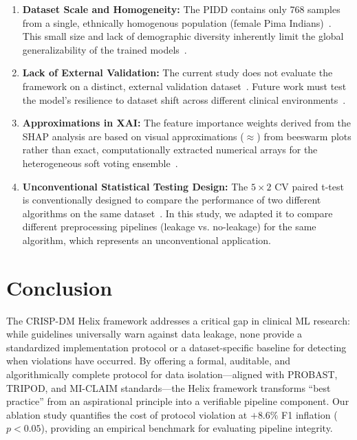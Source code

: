 \documentclass[3p,twocolumn]{elsarticle}
\begin{document}
\begin{enumerate}[nosep]
    \item \textbf{Dataset Scale and Homogeneity:} The PIDD contains only 768 samples from a single, ethnically homogenous population (female Pima Indians)~\cite{KagglePIDD, Smith1988}. This small size and lack of demographic diversity inherently limit the global generalizability of the trained models~\cite{Riley2020SampleSize}.
    \item \textbf{Lack of External Validation:} The current study does not evaluate the framework on a distinct, external validation dataset~\cite{Kapoor2024Leakage}. Future work must test the model's resilience to dataset shift across different clinical environments~\cite{Wen2024Leakage}.
    \item \textbf{Approximations in XAI:} The feature importance weights derived from the SHAP analysis are based on visual approximations ($\approx$) from beeswarm plots rather than exact, computationally extracted numerical arrays for the heterogeneous soft voting ensemble~\cite{Kapoor2024Leakage}.
    \item \textbf{Unconventional Statistical Testing Design:} The $5 \times 2$ CV paired t-test is conventionally designed to compare the performance of two different algorithms on the same dataset~\cite{Dietterich1998}. In this study, we adapted it to compare different preprocessing pipelines (leakage vs. no-leakage) for the same algorithm, which represents an unconventional application.
\end{enumerate}


\section{Conclusion}

The CRISP-DM Helix framework addresses a critical gap in clinical ML research: while guidelines universally warn against data leakage, none provide a standardized implementation protocol or a dataset-specific baseline for detecting when violations have occurred. By offering a formal, auditable, and algorithmically complete protocol for data isolation---aligned with PROBAST, TRIPOD, and MI-CLAIM standards---the Helix framework transforms ``best practice'' from an aspirational principle into a verifiable pipeline component. Our ablation study quantifies the cost of protocol violation at $+8.6\%$ F1 inflation ($p < 0.05$), providing an empirical benchmark for evaluating pipeline integrity.
\end{document}
